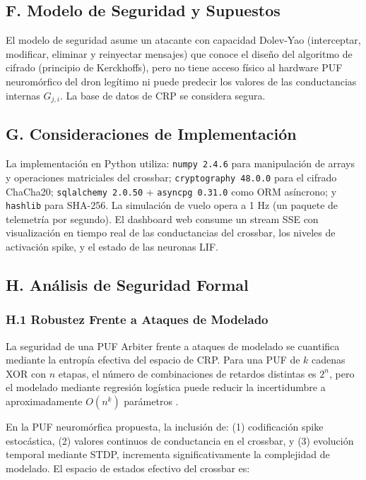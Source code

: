 \subsection*{F. Modelo de Seguridad y Supuestos}

El modelo de seguridad asume un atacante con capacidad Dolev-Yao (interceptar, modificar, eliminar y reinyectar mensajes) que conoce el diseño del algoritmo de cifrado (principio de Kerckhoffs), pero no tiene acceso físico al hardware PUF neuromórfico del dron legítimo ni puede predecir los valores de las conductancias internas $G_{j,i}$. La base de datos de CRP se considera segura.

\subsection*{G. Consideraciones de Implementación}

La implementación en Python utiliza: \texttt{numpy 2.4.6} para manipulación de arrays y operaciones matriciales del crossbar; \texttt{cryptography 48.0.0} para el cifrado ChaCha20; \texttt{sqlalchemy 2.0.50} + \texttt{asyncpg 0.31.0} como ORM asíncrono; y \texttt{hashlib} para SHA-256. La simulación de vuelo opera a 1 Hz (un paquete de telemetría por segundo). El dashboard web consume un stream SSE con visualización en tiempo real de las conductancias del crossbar, los niveles de activación spike, y el estado de las neuronas LIF.

\subsection*{H. Análisis de Seguridad Formal}

\subsubsection*{H.1 Robustez Frente a Ataques de Modelado}

La seguridad de una PUF Arbiter frente a ataques de modelado se cuantifica mediante la entropía efectiva del espacio de CRP. Para una PUF de $k$ cadenas XOR con $n$ etapas, el número de combinaciones de retardos distintas es $2^{n}$, pero el modelado mediante regresión logística puede reducir la incertidumbre a aproximadamente $O(n^k)$ parámetros \cite{suh2007puf}.

En la PUF neuromórfica propuesta, la inclusión de: (1) codificación spike estocástica, (2) valores continuos de conductancia en el crossbar, y (3) evolución temporal mediante STDP, incrementa significativamente la complejidad de modelado. El espacio de estados efectivo del crossbar es:

